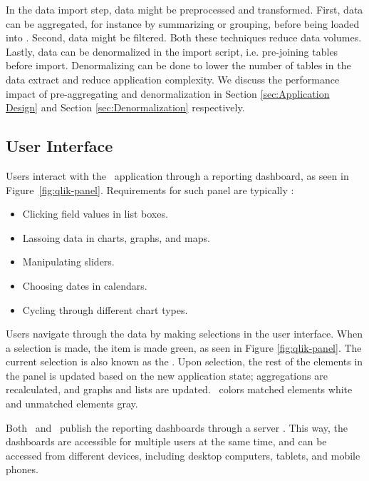 In the data import step, data might be preprocessed and transformed. First, data can be aggregated, for instance by summarizing or grouping, before being loaded into \qlikview. Second, data might be filtered. Both these techniques reduce data volumes. Lastly, data can be denormalized in the import script, i.e. pre-joining tables before import. Denormalizing can be done to lower the number of tables in the data extract and reduce application complexity. We discuss the performance impact of pre-aggregating and denormalization in Section \ref{sec:Application Design} and Section \ref{sec:Denormalization} respectively.

\subsection{User Interface}
\label{sub:User Interface}
Users interact with the \bd~application through a reporting dashboard, as seen in Figure~\ref{fig:qlik-panel}. Requirements for such panel are typically \cite{Qlik2014-vd}:
\begin{itemize}
  \item Clicking field values in list boxes.
  \item Lassoing data in charts, graphs, and maps.
  \item Manipulating sliders.
  \item Choosing dates in calendars.
  \item Cycling through different chart types.
\end{itemize}

Users navigate through the data by making selections in the user interface. When a selection is made, the item is made green, as seen in Figure \ref{fig:qlik-panel}. The current selection is also known as the . Upon selection, the rest of the elements in the panel is updated based on the new application state; aggregations are recalculated, and graphs and lists are updated. \qlikview~colors matched elements white and unmatched elements gray.

Both \qlikview~and \tableau~publish the reporting dashboards through a server \cite{Kamkolkar2015-iq, Qlik2011-ef}. This way, the dashboards are accessible for multiple users at the same time, and can be accessed from different devices, including desktop computers, tablets, and mobile phones.

